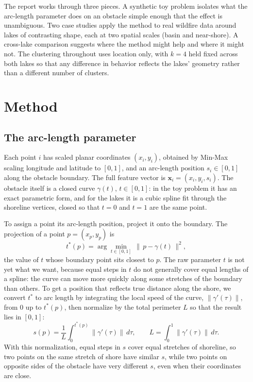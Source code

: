 \documentclass[11pt]{article}
\begin{document}
The report works through three pieces. A synthetic toy problem isolates what the arc-length parameter does on an obstacle simple enough that the effect is unambiguous. Two case studies apply the method to real wildfire data around lakes of contrasting shape, each at two spatial scales (basin and near-shore). A cross-lake comparison suggests where the method might help and where it might not. The clustering throughout uses location only, with $k = 4$ held fixed across both lakes so that any difference in behavior reflects the lakes' geometry rather than a different number of clusters.

 
\section{Method}
\label{sec:method}
 
\subsection{The arc-length parameter}
 
Each point $i$ has scaled planar coordinates $(x_i, y_i)$, obtained by Min-Max scaling longitude and latitude to $[0,1]$, and an arc-length position $s_i \in [0,1]$ along the obstacle boundary. The full feature vector is $\mathbf{x}_i = (x_i, y_i, s_i)$. The obstacle itself is a closed curve $\gamma(t)$, $t \in [0,1]$: in the toy problem it has an exact parametric form, and for the lakes it is a cubic spline fit through the shoreline vertices, closed so that $t = 0$ and $t = 1$ are the same point.
 
To assign a point its arc-length position, project it onto the boundary. The projection of a point $p = (x_p, y_p)$ is
\[
t^*(p) = \arg\min_{t \in [0,1]} \, \big\lVert \, p - \gamma(t) \, \big\rVert^2,
\]
the value of $t$ whose boundary point sits closest to $p$. The raw parameter $t$ is not yet what we want, because equal steps in $t$ do not generally cover equal lengths of a spline: the curve can move more quickly along some stretches of the boundary than others. To get a position that reflects true distance along the shore, we convert $t^*$ to arc length by integrating the local speed of the curve, $\|\gamma'(\tau)\|$, from $0$ up to $t^*(p)$, then normalize by the total perimeter $L$ so that the result lies in $[0,1]$:
\[
s(p) = \frac{1}{L} \int_{0}^{t^*(p)} \big\lVert \gamma'(\tau) \big\rVert \, d\tau,
\qquad
L = \int_{0}^{1} \big\lVert \gamma'(\tau) \big\rVert \, d\tau.
\]
With this normalization, equal steps in $s$ cover equal stretches of shoreline, so two points on the same stretch of shore have similar $s$, while two points on opposite sides of the obstacle have very different $s$, even when their coordinates are close.
 
\end{document}
